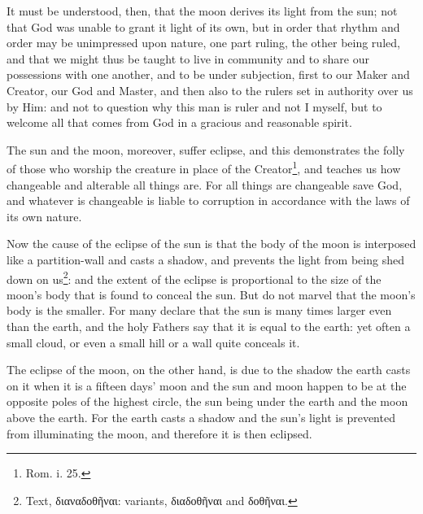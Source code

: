 It must be understood, then, that the moon derives its light from the sun; not that God was unable to grant it light of its own, but in order that rhythm and order may be unimpressed upon nature, one part ruling, the other being ruled, and that we might thus be taught to live in community and to share our possessions with one another, and to be under subjection, first to our Maker and Creator, our God and Master, and then also to the rulers set in authority over us by Him: and not to question why this man is ruler and not I myself, but to welcome all that comes from God in a gracious and reasonable spirit.

The sun and the moon, moreover, suffer eclipse, and this demonstrates the folly of those who worship the creature in place of the Creator\footnote{Rom. i. 25.}, and teaches us how changeable and alterable all things are. For all things are changeable save God, and whatever is changeable is liable to corruption in accordance with the laws of its own nature.

Now the cause of the eclipse of the sun is that the body of the moon is interposed like a partition-wall and casts a shadow, and prevents the light from being shed down on us\footnote{Text, \textgreek{διαναδοθῆναι}: variants, \textgreek{διαδοθῆναι} and \textgreek{δοθῆναι}.}: and the extent of the eclipse is proportional to the size of the moon’s body that is found to conceal the sun. But do not marvel that the moon’s body is the smaller. For many declare that the sun is many times larger even than the earth, and the holy Fathers say that it is equal to the earth: yet often a small cloud, or even a small hill or a wall quite conceals it.

The eclipse of the moon, on the other hand, is due to the shadow the earth casts on it when it is a fifteen days’ moon and the sun and moon happen to be at the opposite poles of the highest circle, the sun being under the earth and the moon above the earth. For the earth casts a shadow and the sun’s light is prevented from illuminating the moon, and therefore it is then eclipsed.

